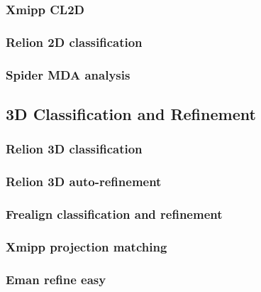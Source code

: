\documentclass[12pt]{article} %
\begin{document}
\subsubsection{Xmipp CL2D}
\subsubsection{Relion 2D classification}
\subsubsection{Spider MDA analysis}


\subsection{3D Classification and Refinement}
\subsubsection{Relion 3D classification}
\subsubsection{Relion 3D auto-refinement}
\subsubsection{Frealign classification and refinement}
\subsubsection{Xmipp projection matching}
\subsubsection{Eman refine easy}





\end{document}
